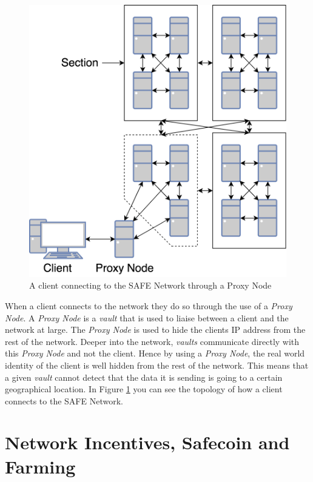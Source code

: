 \begin{figure}
	\begin{center}
		\includegraphics[scale=0.3]{diagrams/safe-network-connection}
		\caption{A client connecting to the SAFE Network through a Proxy Node}
		\label{fig:proxy-connection}
	\end{center}
\end{figure}

When a client connects to the network they do so through the use of a \textit{Proxy Node}. A \textit{Proxy Node} is a \textit{vault} that is used to liaise between a client and the network at large. The \textit{Proxy Node} is used to hide the clients IP address from the rest of the network. Deeper into the network, \textit{vaults} communicate directly with this \textit{Proxy Node} and not the client. Hence by using a \textit{Proxy Node}, the real world identity of the client is well hidden from the rest of the network. This means that a given \textit{vault} cannot detect that the data it is sending is going to a certain geographical location. In Figure \ref{fig:proxy-connection} you can see the topology of how a client connects to the SAFE Network.

\section{Network Incentives, Safecoin and Farming}

